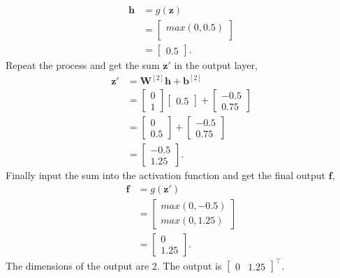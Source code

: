 \documentclass[10pt]{article}
\begin{document}
\begin{enumerate}[1)]
\begin{align*}
\pmb{h}&=g(\pmb{z})\\
&=
  \begin{bmatrix}
    max(0,0.5)\\
  \end{bmatrix}\\
&=
  \begin{bmatrix}
    0.5
  \end{bmatrix}.
\end{align*}
Repeat the process and get the sum $\pmb{z}'$ in the output layer,
\begin{align*}
\pmb{z}'&=\pmb{W}^{[2]}\pmb{h}+\pmb{b}^{[2]}\\
&=
  \begin{bmatrix}
    0\\
    1
  \end{bmatrix}
  \begin{bmatrix}
    0.5
  \end{bmatrix}
+
  \begin{bmatrix}
    -0.5\\
    0.75
  \end{bmatrix}\\
&=
  \begin{bmatrix}
    0\\
    0.5
  \end{bmatrix}
+
  \begin{bmatrix}
    -0.5\\
    0.75
  \end{bmatrix}\\
&=
  \begin{bmatrix}
    -0.5\\
    1.25
  \end{bmatrix}.
\end{align*}
Finally input the sum into the activation function and get the final output $\pmb{f}$,
\begin{align*}
\pmb{f}&=g(\pmb{z}')\\
&=
  \begin{bmatrix}
    max(0,-0.5)\\
    max(0,1.25)
  \end{bmatrix}\\
&=
  \begin{bmatrix}
    0\\
    1.25
  \end{bmatrix}.
\end{align*}
The dimensions of the output are 2. The output is $
  \begin{bmatrix}
    0 & 1.25
  \end{bmatrix}
^{\top}$.\\


\end{enumerate}
\end{document}

